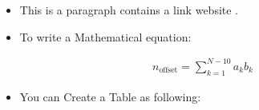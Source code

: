 \documentclass[letterpaper,10pt,english]{sphinxmanual}
\begin{document}
%
\begin{sphinxVerbatim}[commandchars=\\\{\}]
\end{sphinxVerbatim}
\begin{itemize}
\item {} 
This is a paragraph contains a link  website .

\end{itemize}
\begin{itemize}
\item {} 
To write a Mathematical equation:

\end{itemize}
\begin{equation*}
\begin{split}n_{\mathrm{offset}} = \sum_{k=1}^{N-10} a_k b_k\end{split}
\end{equation*}\begin{itemize}
\item {} 
You can Create a Table as following:

\end{itemize}
\end{document}
